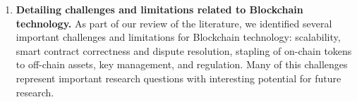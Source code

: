 \begin{enumerate}
	\item \textbf{Detailing challenges and limitations related to Blockchain technology.}
	As part of our review of the literature, we identified several important challenges and limitations for Blockchain technology: scalability, smart contract correctness and dispute resolution, stapling of on-chain tokens to off-chain assets, key management, and regulation.
	Many of this challenges represent important research questions with interesting potential for future research.


	
\end{enumerate}
